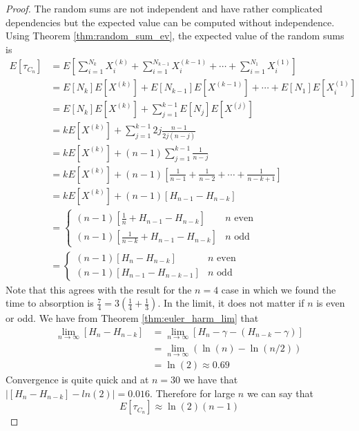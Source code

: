 \begin{proof}
The random sums are not independent and have rather complicated dependencies but the expected value can be computed without independence.
Using Theorem \ref{thm:random_sum_ev}, the expected value of the random sums is
\begin{align*}
    E[\tau_{C_n}] &= E\left[\sum_{i = 1}^{N_k} X_i^{(k)} + \sum_{i = 1}^{N_{k - 1}} X_i^{(k - 1)} + \cdots + \sum_{i = 1}^{N_1} X_i^{(1)}\right]\\
    &= E[N_k] E[X^{(k)}] + E[N_{k - 1}] E[X^{(k - 1)}] + \cdots + E[N_1]E[X_i^{(1)}]\\
    &= E[N_k] E[X^{(k)}] + \sum_{j = 1}^{k - 1} E[N_j]E[X^{(j)}]\\
    &= k E[X^{(k)}] + \sum_{j = 1}^{k - 1} 2j \frac{n - 1}{2j (n - j)} \\
    &= k E[X^{(k)}] + (n - 1) \sum_{j = 1}^{k - 1} \frac{1}{n - j}\\
    &= k E[X^{(k)}] + (n - 1) \left[ \frac{1}{n - 1} + \frac{1}{n - 2} + \cdots + \frac{1}{n - k + 1} \right]\\
    &= k E[X^{(k)}] + (n - 1) \left[ H_{n - 1} - H_{n - k} \right]\\
    &= \begin{cases}
    (n - 1) \left[\frac{1}{n} + H_{n - 1} - H_{n - k}\right] & n \text{ even}\\
    (n - 1) \left[\frac{1}{n - k} + H_{n - 1} - H_{n - k}\right] & n \text{ odd}
    \end{cases}\\
    &= \begin{cases}
    (n - 1) \left[H_{n} - H_{n - k}\right] & n \text{ even}\\
    (n - 1) \left[H_{n - 1} - H_{n - k - 1}\right] & n \text{ odd}
\end{cases}
\end{align*}
Note that this agrees with the result for the $n = 4$ case in which we found the time to absorption is $\frac{7}{4} = 3 (\frac{1}{4} + \frac{1}{3})$.
In the limit, it does not matter if $n$ is even or odd.
We have from Theorem \ref{thm:euler_harm_lim} that
\begin{align*}
    \lim_{n \to \infty} [H_{n} - H_{n - k}] &=  \lim_{n \to \infty} [H_{n} - \gamma - (H_{n - k} - \gamma)]\\
    &= \lim_{n \to \infty} (\ln(n) - \ln(n/2))\\
    &= \ln(2) \approx 0.69
\end{align*}
Convergence is quite quick and at $n = 30$ we have that $|[H_{n} - H_{n - k}] - ln(2)| = 0.016$.
Therefore for large $n$ we can say that
$$
E[\tau_{C_n}] \approx \ln(2) (n - 1)
$$
\end{proof}

